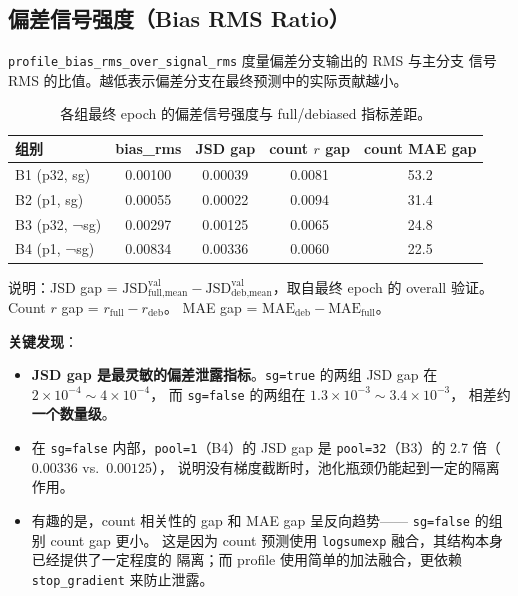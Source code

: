 \documentclass[11pt,a4paper]{ctexart}
\begin{document}
\subsection{偏差信号强度（Bias RMS Ratio）}

\texttt{profile\_bias\_rms\_over\_signal\_rms} 度量偏差分支输出的 RMS 与主分支
信号 RMS 的比值。越低表示偏差分支在最终预测中的实际贡献越小。

\begin{table}[H]
\centering
\small
\caption{各组最终 epoch 的偏差信号强度与 full/debiased 指标差距。}
\label{tab:bias_leakage}
\begin{tabular}{l c c c c}
\toprule
组别 & bias\_rms & JSD gap & count $r$ gap & count MAE gap \\
\midrule
B1 (p32, sg)   & 0.00100 & 0.00039 & 0.0081 & 53.2 \\
B2 (p1, sg)    & 0.00055 & 0.00022 & 0.0094 & 31.4 \\
B3 (p32, ¬sg)  & 0.00297 & 0.00125 & 0.0065 & 24.8 \\
B4 (p1, ¬sg)   & 0.00834 & 0.00336 & 0.0060 & 22.5 \\
\bottomrule
\end{tabular}
\end{table}

\noindent 说明：JSD gap = $\mathrm{JSD}_\text{full,mean}^{\text{val}} -
\mathrm{JSD}_\text{deb,mean}^{\text{val}}$，取自最终 epoch 的 overall 验证。
Count $r$ gap = $r_\text{full} - r_\text{deb}$。
MAE gap = $\mathrm{MAE}_\text{deb} - \mathrm{MAE}_\text{full}$。

\textbf{关键发现}：
\begin{itemize}[leftmargin=2em]
  \item \textbf{JSD gap 是最灵敏的偏差泄露指标}。\texttt{sg=true} 的两组
    JSD gap 在 $2 \times 10^{-4} \sim 4 \times 10^{-4}$，
    而 \texttt{sg=false} 的两组在 $1.3 \times 10^{-3} \sim 3.4 \times 10^{-3}$，
    相差约 \textbf{一个数量级}。
  \item 在 \texttt{sg=false} 内部，\texttt{pool=1}（B4）的 JSD gap 是
    \texttt{pool=32}（B3）的 2.7 倍（$0.00336$ vs.\ $0.00125$），
    说明没有梯度截断时，池化瓶颈仍能起到一定的隔离作用。
  \item 有趣的是，count 相关性的 gap 和 MAE gap 呈反向趋势——
    \texttt{sg=false} 的组别 count gap 更小。
    这是因为 count 预测使用 \texttt{logsumexp} 融合，其结构本身已经提供了一定程度的
    隔离；而 profile 使用简单的加法融合，更依赖 \texttt{stop\_gradient} 来防止泄露。
\end{itemize}
\end{document}
